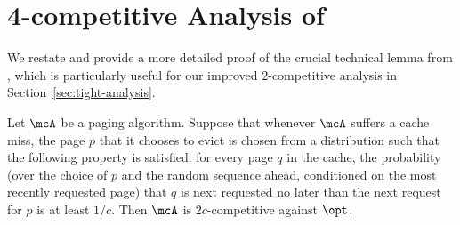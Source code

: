 \section{4-competitive Analysis of \cite{lund1999paging}}
\label{sec:lpr}

We restate and provide a more detailed proof of the crucial technical lemma from \cite{lund1999paging}, which is particularly useful for our improved $2$-competitive analysis in Section~\ref{sec:tight-analysis}.

\begin{lemma}
    \label{lem:lpr}
    Let $\mcA$ be a paging algorithm. Suppose that whenever $\mcA$ suffers a cache miss, the page $p$ that it chooses to evict is chosen from a distribution such that the following property is satisfied: for every page $q$ in the cache, the probability (over the choice of $p$ and the random sequence ahead, conditioned on the most recently requested page) that $q$ is next requested no later than the next request for $p$ is at least $1/c$. Then $\mcA$ is $2c$-competitive against $\opt$.
\end{lemma}
